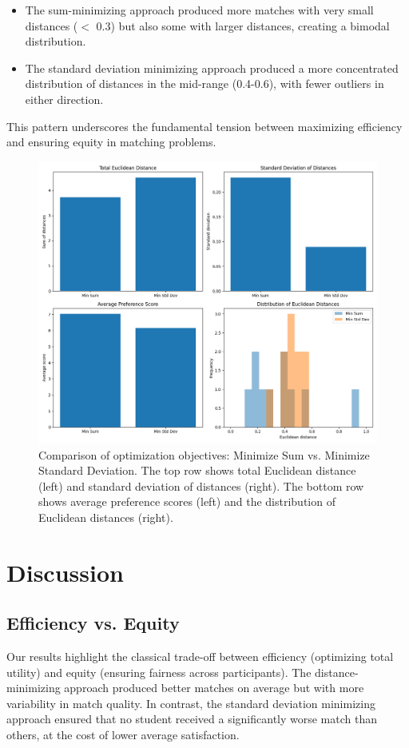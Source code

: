 \documentclass[10pt,journal,compsoc]{IEEEtran}
\begin{document}
\begin{itemize}
\item The sum-minimizing approach produced more matches with very small distances ($<$ 0.3) but also some with larger distances, creating a bimodal distribution.
\item The standard deviation minimizing approach produced a more concentrated distribution of distances in the mid-range (0.4-0.6), with fewer outliers in either direction.
\end{itemize}

This pattern underscores the fundamental tension between maximizing efficiency and ensuring equity in matching problems.

\begin{figure}[!t]
\centering
\includegraphics[width=\columnwidth]{objective_comparison.png}
\caption{Comparison of optimization objectives: Minimize Sum vs. Minimize Standard Deviation. The top row shows total Euclidean distance (left) and standard deviation of distances (right). The bottom row shows average preference scores (left) and the distribution of Euclidean distances (right).}
\label{fig:objective_comparison}
\end{figure}

\section{Discussion}

\subsection{Efficiency vs. Equity}
Our results highlight the classical trade-off between efficiency (optimizing total utility) and equity (ensuring fairness across participants). The distance-minimizing approach produced better matches on average but with more variability in match quality. In contrast, the standard deviation minimizing approach ensured that no student received a significantly worse match than others, at the cost of lower average satisfaction.
\end{document}
